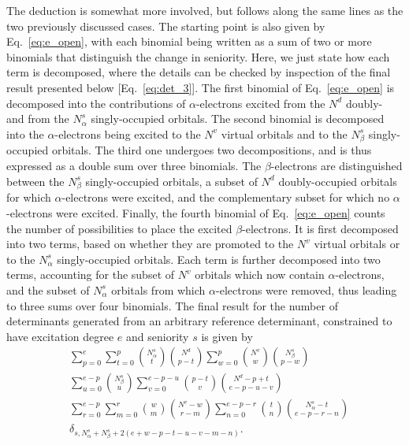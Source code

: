 \documentclass[aip,jcp,reprint,noshowkeys,superscriptaddress]{revtex4-1}
\newcommand{\Nd}{N^{d}}
\newcommand{\Nv}{N^{v}}
\newcommand{\Nas}{N^s_{\alpha}}
\newcommand{\Nbs}{N^s_{\beta}}
\begin{document}
The deduction is somewhat more involved, but follows along the same lines as the two previously discussed cases.
The starting point is also given by Eq.~\ref{eq:e_open}, with each binomial being written as a sum of two or more binomials that distinguish the change in seniority.
Here, we just state how each term is decomposed, where the details can be checked by inspection of the final result presented below [Eq.~\eqref{eq:det_3}].
The first binomial of Eq.~\ref{eq:e_open} is decomposed into the contributions of $\alpha$-electrons excited from the $\Nd$ doubly- and from the $\Nas$ singly-occupied orbitals.
The second binomial is decomposed into the $\alpha$-electrons being excited to the $\Nv$ virtual orbitals and to the $\Nbs$ singly-occupied orbitals.
The third one undergoes two decompositions, and is thus expressed as a double sum over three binomials.
The $\beta$-electrons are distinguished between the $\Nbs$ singly-occupied orbitals, a subset of $\Nd$ doubly-occupied orbitals for which $\alpha$-electrons were excited,
and the complementary subset for which no $\alpha$-electrons were excited.
Finally, the fourth binomial of Eq.~\ref{eq:e_open} counts the number of possibilities to place the excited $\beta$-electrons.
It is first decomposed into two terms, based on whether they are promoted to the $\Nv$ virtual orbitals or to the $\Nas$ singly-occupied orbitals.
Each term is further decomposed into two terms, accounting for the subset of $\Nv$ orbitals which now contain $\alpha$-electrons,
and the subset of $\Nas$ orbitals from which $\alpha$-electrons were removed,
thus leading to three sums over four binomials.
The final result for the number of determinants generated from an arbitrary reference determinant, constrained to have excitation degree $e$ and seniority $s$ is given by
\begin{equation}
\begin{split}
	& \sum_{p=0}^{e} 
	\sum_{t=0}^{p} \binom{\Nas}{t} \binom{\Nd}{p-t} 
	\sum_{w=0}^{p} \binom{\Nv}{w} \binom{\Nbs}{p-w} \\
	& \sum_{u=0}^{e-p} \binom{\Nbs}{u} 
	\sum_{v=0}^{e-p-u} \binom{p-t}{v} \binom{\Nd-p+t}{e-p-u-v} \\
	& \sum_{r=0}^{e-p} \sum_{m=0}^{r} \binom{w}{m} \binom{\Nv-w}{r-m} 
	\sum_{n=0}^{e-p-r} \binom{t}{n} \binom{\Nas-t}{e-p-r-n} \\
	& \delta_{s,\Nas+\Nbs+2(e+w-p-t-u-v-m-n)}.
\label{eq:det_3}
\end{split}
\end{equation}



\end{document}
